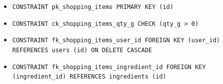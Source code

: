\begin{itemize}
\item \raggedright {\small\texttt{CONSTRAINT pk\_\allowbreak{}\allowbreak{}shopping\_\allowbreak{}\allowbreak{}items PRIMARY KEY (id)}}
\item \raggedright {\small\texttt{CONSTRAINT ck\_\allowbreak{}\allowbreak{}shopping\_\allowbreak{}\allowbreak{}items\_\allowbreak{}\allowbreak{}qty\_\allowbreak{}\allowbreak{}g CHECK (qty\_\allowbreak{}\allowbreak{}g > 0)}}
\item \raggedright {\small\texttt{CONSTRAINT fk\_\allowbreak{}\allowbreak{}shopping\_\allowbreak{}\allowbreak{}items\_\allowbreak{}\allowbreak{}user\_\allowbreak{}\allowbreak{}id FOREIGN KEY (user\_\allowbreak{}\allowbreak{}id) REFERENCES users (id) ON DELETE CASCADE}}
\item \raggedright {\small\texttt{CONSTRAINT fk\_\allowbreak{}\allowbreak{}shopping\_\allowbreak{}\allowbreak{}items\_\allowbreak{}\allowbreak{}ingredient\_\allowbreak{}\allowbreak{}id FOREIGN KEY (ingredient\_\allowbreak{}\allowbreak{}id) REFERENCES ingredients (id)}}
\end{itemize}
